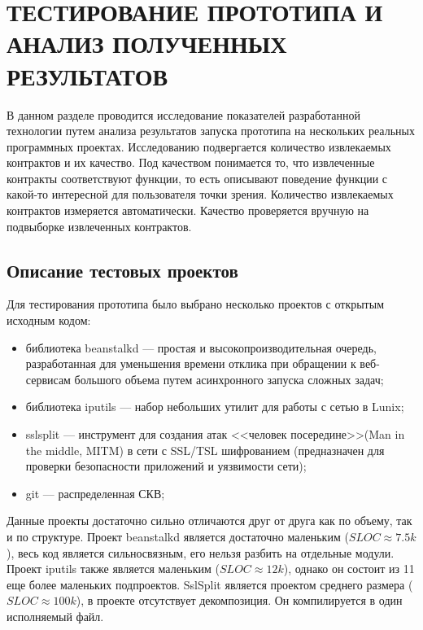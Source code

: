 \chapter{ТЕСТИРОВАНИЕ ПРОТОТИПА И АНАЛИЗ ПОЛУЧЕННЫХ РЕЗУЛЬТАТОВ}
\label{chapter:testing}
В данном разделе проводится исследование показателей разработанной технологии путем анализа результатов запуска прототипа на нескольких реальных программных проектах. Исследованию подвергается количество извлекаемых контрактов и их качество. Под качеством понимается то, что извлеченные контракты соответствуют функции, то есть описывают поведение функции с какой-то интересной для пользователя точки зрения. Количество извлекаемых контрактов измеряется автоматически. Качество проверяется вручную на подвыборке извлеченных контрактов.

\section{Описание тестовых проектов}
Для тестирования прототипа было выбрано несколько проектов с открытым исходным кодом:
\begin{itemize}
\item библиотека beanstalkd --- простая и высокопроизводительная очередь, разработанная для уменьшения времени отклика при обращении к веб-сервисам большого объема путем асинхронного запуска сложных задач;
\item библиотека iputils --- набор небольших утилит для работы с сетью в Lunix;
\item sslsplit --- инструмент для создания атак <<человек посередине>>(Man in the middle, MITM) в сети с SSL/TSL шифрованием (предназначен для проверки безопасности приложений и уязвимости сети);
\item git --- распределенная СКВ;
\end{itemize}

Данные проекты достаточно сильно отличаются друг от друга как по объему, так и по структуре. Проект beanstalkd является достаточно маленьким ($SLOC \approx 7.5k$), весь код является сильносвязным, его нельзя разбить на отдельные модули. Проект iputils также является маленьким ($SLOC \approx 12k$), однако он состоит из 11 еще более маленьких подпроектов. SslSplit является проектом среднего размера ($SLOC \approx 100k$), в проекте отсутствует декомпозиция. Он компилируется в один исполняемый файл.

